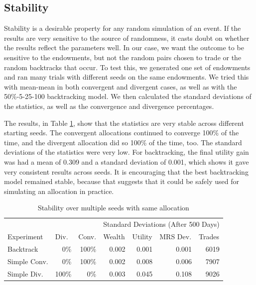 \documentclass[12pt,a4paper,titlepage]{article}
\newcommand{\co}[1]{\textsf{#1}}
\begin{document}
\subsection{Stability}
Stability is a desirable property for any random simulation of an event.
If the results are very sensitive to the source of randomness, it casts doubt on whether the results reflect the parameters well.
In our case, we want the outcome to be sensitive to the endowments, but not the random pairs chosen to trade or the random backtracks that occur. 
To test this, we generated one set of endowments and ran many trials with different seeds on the same endowments.
We tried this with \co{mean}-\co{mean} in both convergent and divergent cases, as well as with the 50\%-5-25-100 backtracking model.
We then calculated the standard deviations of the statistics, as well as the convergence and divergence percentages.

The results, in Table \ref{tab:stable}, show that the statistics are very stable across different starting seeds.
The convergent allocations continued to converge 100\% of the time, and the divergent allocation did so 100\% of the time, too.
The standard deviations of the statistics were very low.
For backtracking, the final utility gain was had a mean of 0.309 and a standard deviation of 0.001, which shows it gave very consistent results across seeds.
It is encouraging that the best backtracking model remained stable, because that suggests that it could be safely used for simulating an allocation in practice.

\begin{table}[h]
  \begin{tabular}{l|rr|rrrr}
    & \multicolumn{1}{l}{} & \multicolumn{1}{l}{} & \multicolumn{ 4}{|c}{Standard Deviations (After 500 Days)} \\ 
    Experiment & \multicolumn{1}{l}{Div.} & \multicolumn{1}{l|}{Conv.} & \multicolumn{1}{l}{Wealth} & \multicolumn{1}{l}{Utility} & \multicolumn{1}{l}{MRS Dev.} & \multicolumn{1}{l}{Trades} \\ 
    \hline
    Backtrack & 0\% & 100\% & 0.002 & 0.001 & 0.001 & 6019 \\ 
    Simple Conv. & 0\% & 100\% & 0.002 & 0.008 & 0.006 & 7907 \\ 
    Simple Div. & 100\% & 0\% & 0.003 & 0.045 & 0.108 & 9026 \\ 
  \end{tabular}
  \caption{Stability over multiple seeds with same allocation}
  \label{tab:stable}
\end{table}
\end{document}
